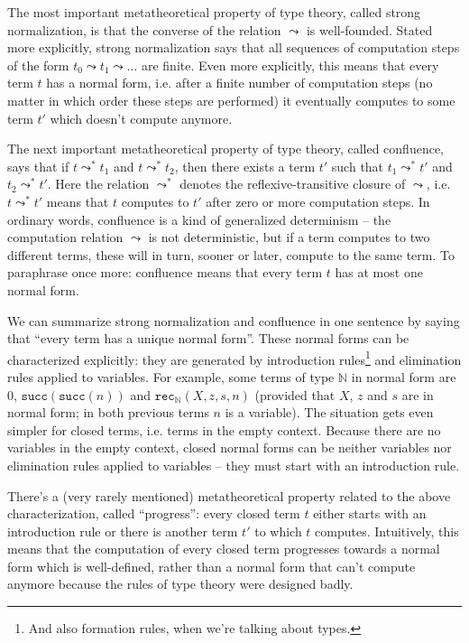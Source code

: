\documentclass[declaration,mgr,english,shortabstract]{iithesis}
\newcommand{\m}[1]{\texttt{#1}}
\newcommand{\N}{\mathbb{N}}
\newcommand{\suc}[1]{\m{succ}(#1)}
\newcommand{\recN}[4]{\m{rec}_\N(#1, #2, #3, #4)}
\begin{document}
The most important metatheoretical property of type theory, called strong normalization, is that the converse of the relation $\leadsto$ is well-founded. Stated more explicitly, strong normalization says that all sequences of computation steps of the form $t_0 \leadsto t_1 \leadsto \dots$ are finite. Even more explicitly, this means that every term $t$ has a normal form, i.e. after a finite number of computation steps (no matter in which order these steps are performed) it eventually computes to some term $t'$ which doesn't compute anymore.

The next important metatheoretical property of type theory, called confluence, says that if $t \leadsto^* t_1$ and $t \leadsto^* t_2$, then there exists a term $t'$ such that $t_1 \leadsto^* t'$ and $t_2 \leadsto^* t'$. Here the relation $\leadsto^*$ denotes the reflexive-transitive closure of $\leadsto$, i.e. $t \leadsto^* t'$ means that $t$ computes to $t'$ after zero or more computation steps. In ordinary words, confluence is a kind of generalized determinism -- the computation relation $\leadsto$ is not deterministic, but if a term computes to two different terms, these will in turn, sooner or later, compute to the same term. To paraphrase once more: confluence means that every term $t$ has at most one normal form.

We can summarize strong normalization and confluence in one sentence by saying that ``every term has a unique normal form''. These normal forms can be characterized explicitly: they are generated by introduction rules\footnote{And also formation rules, when we're talking about types.} and elimination rules applied to variables. For example, some terms of type $\N$ in normal form are $0$, $\suc{\suc{n}}$ and $\recN{X}{z}{s}{n}$ (provided that $X$, $z$ and $s$ are in normal form; in both previous terms $n$ is a variable). The situation gets even simpler for closed terms, i.e. terms in the empty context. Because there are no variables in the empty context, closed normal forms can be neither variables nor elimination rules applied to variables -- they must start with an introduction rule.

There's a (very rarely mentioned) metatheoretical property related to the above characterization, called ``progress'': every closed term $t$ either starts with an introduction rule or there is another term $t'$ to which $t$ computes. Intuitively, this means that the computation of every closed term progresses towards a normal form which is well-defined, rather than a normal form that can't compute anymore because the rules of type theory were designed badly.
\end{document}
